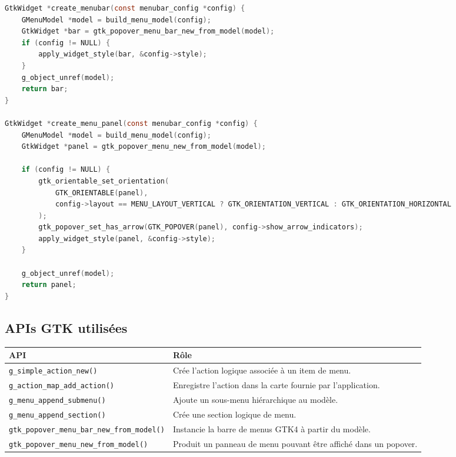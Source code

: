 \begin{lstlisting}[language=C]
GtkWidget *create_menubar(const menubar_config *config) {
    GMenuModel *model = build_menu_model(config);
    GtkWidget *bar = gtk_popover_menu_bar_new_from_model(model);
    if (config != NULL) {
        apply_widget_style(bar, &config->style);
    }
    g_object_unref(model);
    return bar;
}

GtkWidget *create_menu_panel(const menubar_config *config) {
    GMenuModel *model = build_menu_model(config);
    GtkWidget *panel = gtk_popover_menu_new_from_model(model);

    if (config != NULL) {
        gtk_orientable_set_orientation(
            GTK_ORIENTABLE(panel),
            config->layout == MENU_LAYOUT_VERTICAL ? GTK_ORIENTATION_VERTICAL : GTK_ORIENTATION_HORIZONTAL
        );
        gtk_popover_set_has_arrow(GTK_POPOVER(panel), config->show_arrow_indicators);
        apply_widget_style(panel, &config->style);
    }

    g_object_unref(model);
    return panel;
}
\end{lstlisting}

\subsection{APIs GTK utilisées}

\begin{center}
\begin{tabular}{|l|p{8cm}|}
\hline
\textbf{API} & \textbf{Rôle} \\
\hline
\texttt{g\_simple\_action\_new()} & Crée l'action logique associée à un item de menu. \\
\hline
\texttt{g\_action\_map\_add\_action()} & Enregistre l'action dans la carte fournie par l'application. \\
\hline
\texttt{g\_menu\_append\_submenu()} & Ajoute un sous-menu hiérarchique au modèle. \\
\hline
\texttt{g\_menu\_append\_section()} & Crée une section logique de menu. \\
\hline
\texttt{gtk\_popover\_menu\_bar\_new\_from\_model()} & Instancie la barre de menus GTK4 à partir du modèle. \\
\hline
\texttt{gtk\_popover\_menu\_new\_from\_model()} & Produit un panneau de menu pouvant être affiché dans un popover. \\
\hline
\end{tabular}
\end{center}

\newpage
